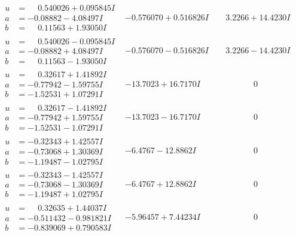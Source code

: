 \documentclass[1p]{elsarticle_modified}
\theoremstyle{definition}
\begin{document}
$$\begin{array}{c|c|c}
\begin{aligned}
u &= \phantom{-}0.540026 + 0.095845 I \\
a &= -0.08882 - 4.08497 I \\
b &= \phantom{-}0.11563 + 1.93050 I\end{aligned}
 & -0.576070 + 0.516826 I & \phantom{-}3.2266 + 14.4230 I \\ \hline\begin{aligned}
u &= \phantom{-}0.540026 - 0.095845 I \\
a &= -0.08882 + 4.08497 I \\
b &= \phantom{-}0.11563 - 1.93050 I\end{aligned}
 & -0.576070 - 0.516826 I & \phantom{-}3.2266 - 14.4230 I \\ \hline\begin{aligned}
u &= \phantom{-}0.32617 + 1.41892 I \\
a &= -0.77942 - 1.59755 I \\
b &= -1.52531 + 1.07291 I\end{aligned}
 & -13.7023 + 16.7170 I & \phantom{-0.000000 } 0 \\ \hline\begin{aligned}
u &= \phantom{-}0.32617 - 1.41892 I \\
a &= -0.77942 + 1.59755 I \\
b &= -1.52531 - 1.07291 I\end{aligned}
 & -13.7023 - 16.7170 I & \phantom{-0.000000 } 0 \\ \hline\begin{aligned}
u &= -0.32343 + 1.42557 I \\
a &= -0.73068 + 1.30369 I \\
b &= -1.19487 - 1.02795 I\end{aligned}
 & -6.4767 - 12.8862 I & \phantom{-0.000000 } 0 \\ \hline\begin{aligned}
u &= -0.32343 - 1.42557 I \\
a &= -0.73068 - 1.30369 I \\
b &= -1.19487 + 1.02795 I\end{aligned}
 & -6.4767 + 12.8862 I & \phantom{-0.000000 } 0 \\ \hline\begin{aligned}
u &= \phantom{-}0.32635 + 1.44037 I \\
a &= -0.511432 - 0.981821 I \\
b &= -0.839069 + 0.790583 I\end{aligned}
 & -5.96457 + 7.44234 I & \phantom{-0.000000 } 0\\

\end{array}$$
\end{document}
